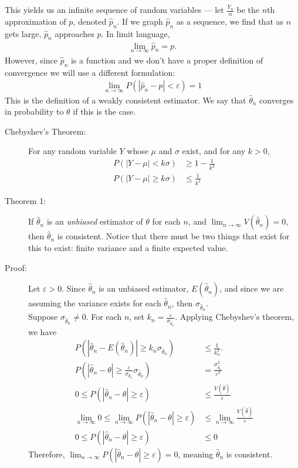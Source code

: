 \documentclass[10pt]{extarticle}
\begin{document}
  This yields us an infinite sequence of random variables --- let $\frac{Y_n}{n}$ be the $n$th approximation of $p$, denoted $\hat{p}_n$. If we graph $\hat{p}_n$ as a sequence, we find that as $n$ gets large, $\hat{p}_n$ approaches $p$. In limit language,
  \begin{align*}
    \lim_{n\rightarrow \infty}\hat{p}_n = p.
  \end{align*}
  However, since $\hat{p}_n$ is a function and we don't have a proper definition of convergence we will use a different formulation:
  \begin{align*}
    \lim_{n\rightarrow \infty} P(|\hat{p}_n - p| < \varepsilon) = 1 \tag*{$\forall \varepsilon > 0$.}
  \end{align*}
  This is the definition of a weakly consistent estimator. We say that $\hat{\theta}_n$ converges in probability to $\theta$ if this is the case.
  \begin{description}
    \item[Chebyshev's Theorem:] For any random variable $Y$ whose $\mu$ and $\sigma$ exist, and for any $k > 0$, 
      \begin{align*}
        P(|Y-\mu|< k\sigma) &\geq 1-\frac{1}{k^2}\\
        P(|Y-\mu| \geq k\sigma) &\leq \frac{1}{k^2}
      \end{align*}
    \item[Theorem 1:] If $\hat{\theta}_n$ is an \textit{unbiased} estimator of $\theta$ for each $n$, and $\lim_{n\rightarrow\infty}V(\hat{\theta}_n) = 0$, then $\hat{\theta}_n$ is consistent. Notice that there must be two things that exist for this to exist: finite variance and a finite expected value.
    \item[Proof:] Let $\varepsilon > 0$. Since $\hat{\theta}_n$ is an unbiased estimator, $E(\hat{\theta}_n)$, and since we are assuming the variance exists for each $\hat{\theta}_n$, then $\sigma_{\hat{\theta}_n}$.\\

      Suppose $\sigma_{\hat{\theta}_n} \neq 0$. For each $n$, set $k_n = \frac{\varepsilon}{\sigma_{\hat{\theta}_n}}$. Applying Chebyshev's theorem, we have
      \begin{align*}
        P(|\hat{\theta}_n - E(\hat{\theta}_n)| \geq k_n\sigma_{\hat{\theta}_n}) &\leq \frac{1}{k_{n}^2}.\\
        P\left(|\hat{\theta}_n - \theta| \geq \frac{\varepsilon}{\sigma_{\hat{\theta}_n}}\sigma_{\hat{\theta}_n}\right) &= \frac{\sigma_{\hat{\theta}_n}^2}{\varepsilon^2}\\
        0 \leq P(|\hat{\theta}_n - \theta| \geq \varepsilon) &\leq \frac{V(\hat{\theta})}{\varepsilon}\\
        \lim_{n\rightarrow\infty} 0 \leq \lim_{n\rightarrow\infty}P(|\hat{\theta}_n - \theta| \geq \varepsilon) &\leq \lim_{n\rightarrow\infty}\frac{V(\hat{\theta})}{\varepsilon}\\
        0 \leq P(|\hat{\theta}_n - \theta| \geq \varepsilon) &\leq 0
      \end{align*}
      Therefore, $\lim_{n\rightarrow\infty}P(|\hat{\theta}_n - \theta| \geq \varepsilon) = 0$, meaning $\hat{\theta}_n$ is consistent.
  \end{description}
\end{document}
